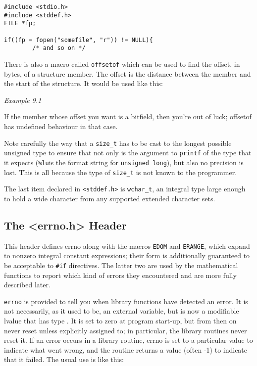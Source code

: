    \begin{Verbatim}
#include <stdio.h>
#include <stddef.h>
FILE *fp;

if((fp = fopen("somefile", "r")) != NULL){
        /* and so on */
\end{Verbatim}

   There is also a macro called \texttt{offsetof} which can be  used  to
    find  the  offset,  in  bytes,  of  a structure member.  The
    offset is the distance between the member and the  start  of
    the structure.  It would be used like this:


   \begin{center}\textit{Example 9.1}\end{center}


   If  the member whose
    offset you want is a bitfield,  then  you're  out  of  luck;
    offsetof has undefined behaviour in that case.


   Note carefully the way that a \texttt{size\_t} has to be cast  to  the
    longest  possible  unsigned  type to ensure that not only is the argument
    to \texttt{printf} of the type that it expects (\texttt{\%lu}is
    the  format string for \texttt{unsigned long}), but also no precision
    is lost.  This is all because the  type  of  \texttt{size\_t}  is  not
    known to the programmer.


   The last item declared in \texttt{<stddef.h>} is
    \texttt{wchar\_t}, an integral type large enough to hold a wide
    character from any supported extended character sets.


  

  \subsection{The <errno.h> Header}
   

   This header defines errno along with the macros \texttt{EDOM} and
    \texttt{ERANGE}, which expand to nonzero integral constant
    expressions; their form is additionally guaranteed to be
    acceptable to \texttt{\#if} directives.  The latter two are used by
    the mathematical functions to report which kind of errors
    they encountered and are more fully described later.


   \texttt{errno} is provided to tell you when library functions have
    detected an error.  It is not necessarily, as it used to be,
    an external variable, but is now a modifiable lvalue that
    has type \kint.  It is set to zero at program start-up, but
    from then on never reset unless explicitly assigned to; in
    particular, the library routines never reset it.  If an
    error occurs in a library routine, errno is set to a
    particular value to indicate what went wrong, and the
    routine returns a value (often -1) to indicate that it
    failed.  The usual use is like this:


